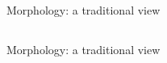 \documentclass[9pt,xcolor=pdftex,dvipsnames,table]{beamer}
\begin{document}
\subsection{}
\begin{frame}{Morphology: a traditional view}

\begin{center}
\end{center}
\end{frame}

\subsection{}
\begin{frame}{Morphology: a traditional view}

\begin{center}
\end{center}
\end{frame}
\end{document}
